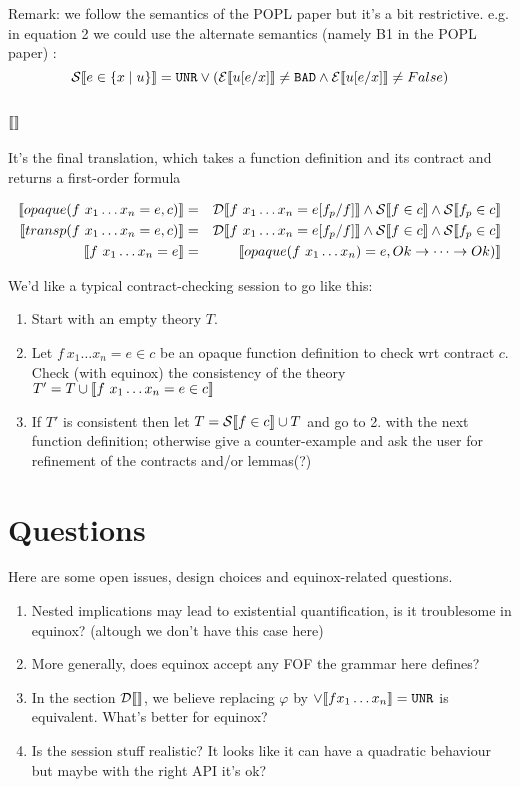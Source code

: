 \documentclass{article}
\begin{document}
Remark: we follow the semantics of the POPL paper but it's a bit restrictive.
e.g. in equation 2 we could use the alternate semantics (namely B1 in the POPL paper) : 
$$\mathcal{S} \llbracket e \in \{x \mid u \} \rrbracket = \texttt{UNR} \lor (\mathcal{E} \llbracket u[e/x] \rrbracket \neq \texttt{BAD} \land \mathcal{E} \llbracket u[e/x] \rrbracket \neq False)$$

\subsection{$\llbracket  \rrbracket$}
It's the final translation, which takes a function definition and its contract and returns a first-order formula\\

\thispagestyle{empty}

\begin{eqnarray*}
\llbracket opaque(f~x_1 \dots x_n = e,c) \rrbracket &=& \mathcal{D} \llbracket f~x_1 \dots x_n = e[f_p/f] \rrbracket \land \mathcal{S} \llbracket f \in c \rrbracket \land \mathcal{S} \llbracket f_p \in c \rrbracket\\
\llbracket transp(f~x_1 \dots x_n = e,c) \rrbracket &=& \mathcal{D} \llbracket f~x_1 \dots x_n = e[f_p/f] \rrbracket \land \mathcal{S} \llbracket f \in c \rrbracket \land \mathcal{S} \llbracket f_p \in c \rrbracket\\
\llbracket f~x_1 \dots x_n = e \rrbracket &=& \llbracket opaque(f~x_1\dots x_n) = e,Ok \to \dots \to Ok) \rrbracket\\
\end{eqnarray*}

We'd like a typical contract-checking session to go like this:
\begin{enumerate}
\item Start with an empty theory $T$.
\item Let $f~x_1 \dots x_n = e \in c$ be an opaque function definition to check wrt contract $c$. Check (with equinox) the consistency of the theory $T' = T \cup \llbracket f~x_1 \dots x_n = e \in c \rrbracket$
\item If $T'$ is consistent then let $T = \mathcal{S} \llbracket f \in c \rrbracket \cup T$ and go to 2. with the next function definition; otherwise give a counter-example and ask the user for refinement of the contracts and/or lemmas(?)
\end{enumerate}

\section{Questions}

Here are some open issues, design choices and equinox-related questions.

\begin{enumerate}
\item Nested implications may lead to existential quantification, is it troublesome in equinox? (altough we don't have this case here)
\item More generally, does equinox accept any FOF the grammar here defines?
\item In the section $\mathcal{D} \llbracket  \rrbracket$, we believe replacing $\varphi$ by $\lor \llbracket f x_1 \dots x_n \rrbracket = \texttt{UNR}$ is equivalent. What's better for equinox?
\item Is the session stuff realistic? It looks like it can have a quadratic behaviour but maybe with the right API it's ok?
\end{enumerate}

\thispagestyle{empty}
\end{document}
